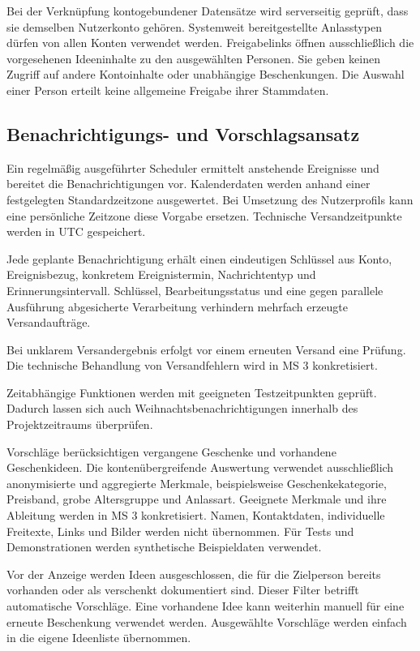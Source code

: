 \documentclass[11pt,a4paper]{article}
\begin{document}
Bei der Verknüpfung kontogebundener Datensätze wird serverseitig geprüft, dass sie demselben Nutzerkonto gehören. Systemweit bereitgestellte Anlasstypen dürfen von allen Konten verwendet werden. Freigabelinks öffnen ausschließlich die vorgesehenen Ideeninhalte zu den ausgewählten Personen. Sie geben keinen Zugriff auf andere Kontoinhalte oder unabhängige Beschenkungen. Die Auswahl einer Person erteilt keine allgemeine Freigabe ihrer Stammdaten.

\subsection{Benachrichtigungs- und Vorschlagsansatz}

Ein regelmäßig ausgeführter Scheduler ermittelt anstehende Ereignisse und bereitet die Benachrichtigungen vor. Kalenderdaten werden anhand einer festgelegten Standardzeitzone ausgewertet. Bei Umsetzung des Nutzerprofils kann eine persönliche Zeitzone diese Vorgabe ersetzen. Technische Versandzeitpunkte werden in UTC gespeichert.

Jede geplante Benachrichtigung erhält einen eindeutigen Schlüssel aus Konto, Ereignisbezug, konkretem Ereignistermin, Nachrichtentyp und Erinnerungsintervall. Schlüssel, Bearbeitungsstatus und eine gegen parallele Ausführung abgesicherte Verarbeitung verhindern mehrfach erzeugte Versandaufträge.

Bei unklarem Versandergebnis erfolgt vor einem erneuten Versand eine Prüfung. Die technische Behandlung von Versandfehlern wird in MS 3 konkretisiert.

Zeitabhängige Funktionen werden mit geeigneten Testzeitpunkten geprüft. Dadurch lassen sich auch Weihnachtsbenachrichtigungen innerhalb des Projektzeitraums überprüfen.

Vorschläge berücksichtigen vergangene Geschenke und vorhandene Geschenkideen. Die kontenübergreifende Auswertung verwendet ausschließlich anonymisierte und aggregierte Merkmale, beispielsweise Geschenkekategorie, Preisband, grobe Altersgruppe und Anlassart. Geeignete Merkmale und ihre Ableitung werden in MS 3 konkretisiert. Namen, Kontaktdaten, individuelle Freitexte, Links und Bilder werden nicht übernommen. Für Tests und Demonstrationen werden synthetische Beispieldaten verwendet.

Vor der Anzeige werden Ideen ausgeschlossen, die für die Zielperson bereits vorhanden oder als verschenkt dokumentiert sind. Dieser Filter betrifft automatische Vorschläge. Eine vorhandene Idee kann weiterhin manuell für eine erneute Beschenkung verwendet werden. Ausgewählte Vorschläge werden einfach in die eigene Ideenliste übernommen.
\end{document}
